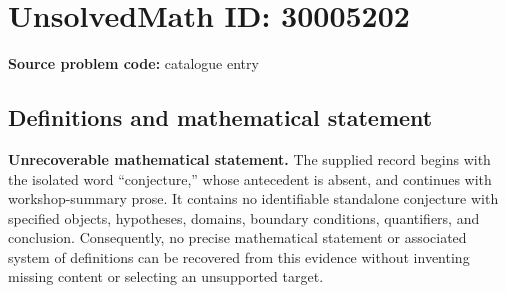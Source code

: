 \documentclass[11pt]{article}
\begin{document}
\section*{UnsolvedMath ID: 30005202}
\textbf{Source problem code:} catalogue entry
\subsection{Definitions and mathematical statement}
\textbf{Unrecoverable mathematical statement.} The supplied record begins with the isolated word ``conjecture,'' whose antecedent is absent, and continues with workshop-summary prose. It contains no identifiable standalone conjecture with specified objects, hypotheses, domains, boundary conditions, quantifiers, and conclusion. Consequently, no precise mathematical statement or associated system of definitions can be recovered from this evidence without inventing missing content or selecting an unsupported target.
\end{document}
